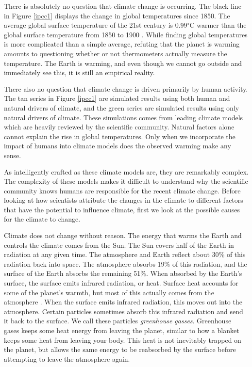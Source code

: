 There is absolutely no question that climate change is occurring. The black line in Figure \ref{ipcc1} displays the change in global temperatures since 1850. The average global surface temperature of the 21st century is 0.99$^\circ$C warmer than the global surface temperature from 1850 to 1900 \citep{ipcc1_summary}. While finding global temperatures is more complicated than a simple average, refuting that the planet is warming amounts to questioning whether or not thermometers actually measure the temperature. The Earth is warming, and even though we cannot go outside and immediately see this, it is still an empirical reality. 

There also no question that climate change is driven primarily by human activity. The tan series in Figure \ref{ipcc1} are simulated results using both human and natural drivers of climate, and the green series are simulated results using only natural drivers of climate. These simulations comes from leading climate models which are heavily reviewed by the scientific community. Natural factors alone cannot explain the rise in global temperatures. Only when we incorporate the impact of humans into climate models does the observed warming make any sense. 

As intelligently crafted as these climate models are, they are remarkably complex. The complexity of these models makes it difficult to understand why the scientific community knows humans are responsible for the recent climate change. Before looking at how scientists attribute the changes in the climate to different factors that have the potential to influence climate, first we look at the possible causes for the climate to change. 

Climate does not change without reason. The energy that warms the Earth and controls the climate comes from the Sun. The Sun covers half of the Earth in radiation at any given time. The atmosphere and Earth reflect about 30\% of this radiation back into space. The atmosphere absorbs 19\% of this radiation, and the surface of the Earth absorbs the remaining 51\%. When absorbed by the Earth's surface, the surface emits infrared radiation, or heat. Surface heat accounts for some of the planet's warmth, but most of this actually comes from the atmosphere \citep{csi}. When the surface emits infrared radiation, this moves out into the atmosphere. Certain particles sometimes absorb this infrared radiation and send it back to the surface. We call these particles \emph{greenhouse gasses}. Greenhouse gases keeps some heat energy from leaving the planet, similar to how a blanket keeps some heat from leaving your body. This heat is not inevitably trapped on the planet, but allows the same energy to be reabsorbed by the surface before attempting to leave the atmosphere again.

